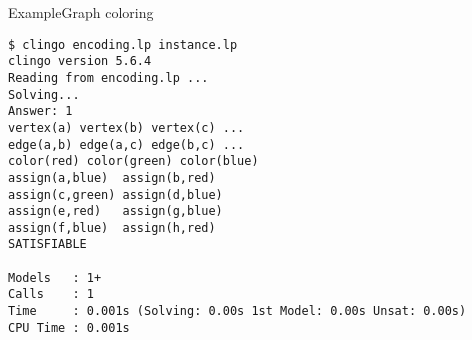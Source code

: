 \begin{frame}[fragile]{Example}{Graph coloring}
\begin{adjustbox}{max totalsize={\textwidth}{.83\textheight},keepaspectratio}
\begin{lstlisting}
$ clingo encoding.lp instance.lp
clingo version 5.6.4
Reading from encoding.lp ...
Solving...
Answer: 1
vertex(a) vertex(b) vertex(c) ...
edge(a,b) edge(a,c) edge(b,c) ...
color(red) color(green) color(blue)
assign(a,blue)  assign(b,red)
assign(c,green) assign(d,blue)
assign(e,red)   assign(g,blue)
assign(f,blue)  assign(h,red)
SATISFIABLE

Models   : 1+
Calls    : 1
Time     : 0.001s (Solving: 0.00s 1st Model: 0.00s Unsat: 0.00s)
CPU Time : 0.001s
\end{lstlisting}%
\end{adjustbox}
\end{frame}
%
